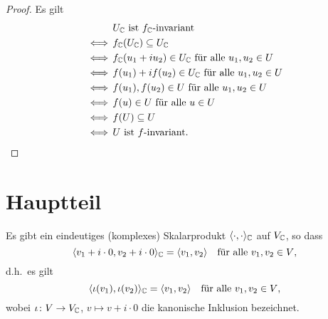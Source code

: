 \documentclass[a4paper,10pt]{article}
\begin{document}
\begin{proof}
  Es gilt
  \begin{align*}
        &\, \text{$U_{\mathbb{C}}$ ist $f_{\mathbb{C}}$-invariant}                            \\
    \iff&\, f_{\mathbb{C}}(U_{\mathbb{C}}) \subseteq U_{\mathbb{C}}                                   \\
    \iff&\, \text{$f_{\mathbb{C}}(u_1 + i u_2) \in U_{\mathbb{C}}$ für alle $u_1, u_2 \in U$} \\
    \iff&\, \text{$f(u_1) + i f(u_2) \in U_{\mathbb{C}}$ für alle $u_1, u_2 \in U$}   \\
    \iff&\, \text{$f(u_1), f(u_2) \in U$ für alle $u_1, u_2 \in U$}           \\
    \iff&\, \text{$f(u) \in U$ für alle $u \in U$}                            \\
    \iff&\, f(U) \subseteq U                                                  \\
    \iff&\, \text{$U$ ist $f$-invariant}.
    \qedhere
  \end{align*}
\end{proof}










\section{Hauptteil}


\begin{proposition}
  Es gibt ein eindeutiges (komplexes) Skalarprodukt $\langle \cdot, \cdot \rangle_{\mathbb{C}}$ auf $V_{\mathbb{C}}$, so dass
  \[
      \langle v_1 + i \cdot 0, v_2 + i \cdot 0 \rangle_{\mathbb{C}}
    = \langle v_1, v_2 \rangle
    \quad
    \text{für alle $v_1, v_2 \in V$},
  \]
  d.h.\ es gilt
  \[
    \langle \iota(v_1), \iota(v_2) \rangle_{\mathbb{C}} = \langle v_1, v_2 \rangle
    \quad\text{für alle $v_1, v_2 \in V$},
  \]
  wobei $\iota \colon V \to V_{\mathbb{C}}$, $v \mapsto v + i \cdot 0$ die kanonische Inklusion bezeichnet.
\end{proposition}
\end{document}
